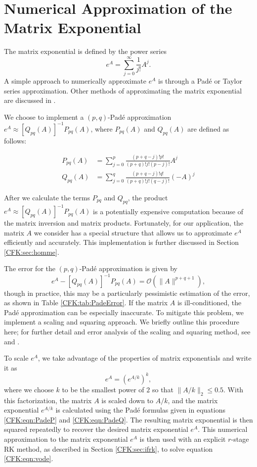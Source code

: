 \documentclass{csri19}
\begin{document}
\section{Numerical Approximation of the Matrix Exponential}
\label{CFK:sec:matexp} 
The matrix exponential is defined by the power series 
\[ e^A = \sum_{j=0}^\infty \frac{1}{j!}A^j.\]
A simple approach to numerically approximate $e^{A}$ is through a Pad\'e or 
Taylor series approximation. Other methods of approximating the matrix 
exponential are discussed in \cite{CFK:Moler2003}.

We choose to implement a $(p,q)$-Pad\'e approximation 
$e^{A}\approx \left[Q_{pq}(A)\right]^{-1}P_{pq}(A)$, where $P_{pq}(A)$ and 
$Q_{pq}(A)$ are defined as follows:

\begin{align}
\label{CFK:eqn:PadeP}
P_{pq}(A) &= \sum_{j=0}^p\frac{(p+q-j)!p!}{(p+q)!j!(p-j)!}A^j\\
\label{CFK:eqn:PadeQ}
Q_{pq}(A) &= \sum_{j=0}^q\frac{(p+q-j)!q!}{(p+q)!j!(q-j)!}(-A)^j
\end{align}

After we calculate the terms $P_{pq}$ and $Q_{pq}$, the product 
$e^A\approx\left[Q_{pq}(A)\right]^{-1}P_{pq}(A)$ is a potentially expensive 
computation because of the matrix inversion and matrix products. 
Fortunately, for our application, the matrix $A$ we consider has a special 
structure that allows us to approximate $e^A$ efficiently and accurately. 
This implementation is further discussed in Section \ref{CFK:sec:homme}.

The error for the $(p,q)$-Pad\'e approximation is given by
\[e^A-\left[Q_{pq}(A)\right]^{-1}P_{pq}(A) = \mathcal{O}(\|A\|^{p+q+1}),\] 
though in practice, this may be a particularly pessimistic estimation of 
the error, as shown in Table \ref{CFK:tab:PadeError}. If the matrix $A$ is 
ill-conditioned, the Pad\'e  approximation can be especially inaccurate. 
To mitigate this problem, we implement a scaling and squaring approach. We 
briefly outline this procedure here; for further detail and error analysis 
of the scaling and squaring method, see \cite{CFK:Al-Mohy2009} and 
\cite{CFK:higham2005}.


To scale $e^A$, we take advantage of the properties of matrix exponentials 
and write it as
\[e^{A} = \left(e^{A/k}\right)^k,\]
where we choose $k$ to be the smallest power of $2$ so that $\|A/k\|_2
\leq 0.5$. With this factorization, the matrix $A$ is scaled down to $A/k$, 
and the matrix exponential $e^{A/k}$ is calculated using the Pad\'e 
formulas given in equations \ref{CFK:eqn:PadeP} and \ref{CFK:eqn:PadeQ}. 
The resulting matrix exponential is then squared repeatedly to recover the 
desired matrix exponential $e^{A}$. This numerical approximation to the 
matrix exponential $e^A$ is then used with an explicit $r$-stage RK method, 
as described in Section \ref{CFK:sec:ifrk}, to solve equation 
\ref{CFK:eqn:vode}.
\end{document}
